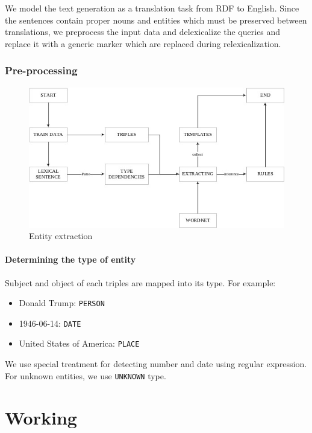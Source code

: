 \documentclass[a4paper,12pt,oneside]{book}
\begin{document}
We model the text generation as a translation task from RDF to English. Since the sentences contain proper nouns and entities which must be preserved between translations, we preprocess the input data and delexicalize the queries and replace it with a generic marker which are replaced during relexicalization. 

\subsection{Pre-processing}

\begin{figure}
    \centering
    \includegraphics[width=\textwidth]{images/preprocessing.jpg}
    \caption{Entity extraction}
    \label{fig:preprocessing}
\end{figure}

\subsubsection{Determining the type of entity}

Subject and object of each triples are mapped into its type. For example: 
\begin{itemize}
    \item Donald Trump: \texttt{PERSON}
    \item 1946-06-14: \texttt{DATE}
    \item United States of America: \texttt{PLACE}
\end{itemize}

We use special treatment for detecting number and date using regular expression. For unknown entities, we use \texttt{UNKNOWN} type.

\chapter{Working}
\end{document}
